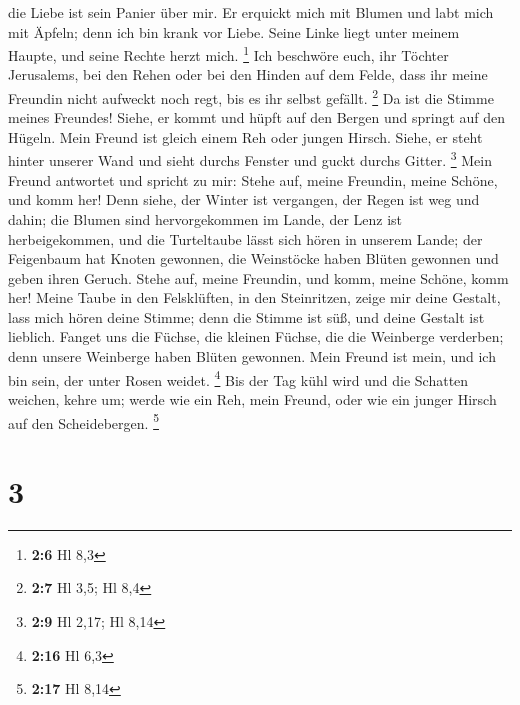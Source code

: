 die Liebe ist sein Panier über mir.  Er erquickt mich mit
Blumen und labt mich mit Äpfeln; denn ich bin krank vor Liebe.
 Seine Linke liegt unter meinem Haupte, und seine Rechte
herzt mich. \footnote{\textbf{2:6} Hl 8,3}  Ich beschwöre
euch, ihr Töchter Jerusalems, bei den Rehen oder bei den Hinden auf dem
Felde, dass ihr meine Freundin nicht aufweckt noch regt, bis es ihr
selbst gefällt. \footnote{\textbf{2:7} Hl 3,5; Hl 8,4}  Da
ist die Stimme meines Freundes! Siehe, er kommt und hüpft auf den Bergen
und springt auf den Hügeln.  Mein Freund ist gleich einem
Reh oder jungen Hirsch. Siehe, er steht hinter unserer Wand und sieht
durchs Fenster und guckt durchs Gitter. \footnote{\textbf{2:9} Hl 2,17;
  Hl 8,14}  Mein Freund antwortet und spricht zu mir: Stehe
auf, meine Freundin, meine Schöne, und komm her!  Denn
siehe, der Winter ist vergangen, der Regen ist weg und dahin;
 die Blumen sind hervorgekommen im Lande, der Lenz ist
herbeigekommen, und die Turteltaube lässt sich hören in unserem Lande;
 der Feigenbaum hat Knoten gewonnen, die Weinstöcke haben
Blüten gewonnen und geben ihren Geruch. Stehe auf, meine Freundin, und
komm, meine Schöne, komm her!  Meine Taube in den
Felsklüften, in den Steinritzen, zeige mir deine Gestalt, lass mich
hören deine Stimme; denn die Stimme ist süß, und deine Gestalt ist
lieblich.  Fanget uns die Füchse, die kleinen Füchse, die
die Weinberge verderben; denn unsere Weinberge haben Blüten gewonnen.
 Mein Freund ist mein, und ich bin sein, der unter Rosen
weidet. \footnote{\textbf{2:16} Hl 6,3}  Bis der Tag kühl
wird und die Schatten weichen, kehre um; werde wie ein Reh, mein Freund,
oder wie ein junger Hirsch auf den Scheidebergen. \footnote{\textbf{2:17}
  Hl 8,14}

\hypertarget{section-1}{%
\section{3}\label{section-1}}

